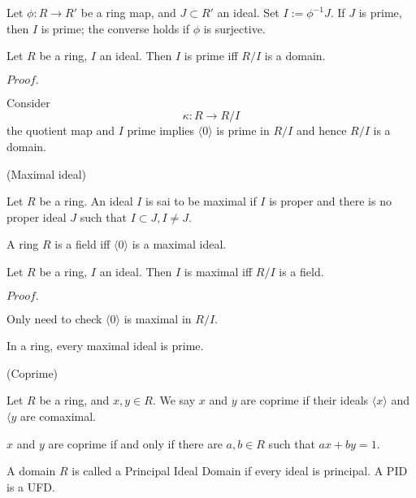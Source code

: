 \documentclass{article}
\newcommand{\Pf}[1]{$Proof.$\par}
\begin{document}
\begin{proposition}
    Let $\phi:R\to R'$ be a ring map, and $J\subset R'$ an ideal. Set $I:=\phi^{-1}J$. If $J$ is prime, then $I$ is prime; the converse holds if $\phi$ is surjective.
\end{proposition}

\begin{corollary}
    Let $R$ be a ring, $I$ an ideal. Then $I$ is prime iff $R/I$ is a domain.
\end{corollary}
\Pf\par
    Consider
    \[
    \kappa:R\to R/I
    \]
    the quotient map and $I$ prime implies $\langle 0 \rangle$ is prime in $R/I$ and hence $R/I$ is a domain.

\begin{definition}
    (Maximal ideal)\par
    Let $R$ be a ring. An ideal $I$ is sai to be maximal if $I$ is proper and there is no proper ideal $J$ such that $I\subset J, I\neq J$.
\end{definition}

\begin{proposition}
    A ring $R$ is a field iff $\langle 0 \rangle$ is a maximal ideal.
\end{proposition}

\begin{corollary}
    Let $R$ be a ring, $I$ an ideal. Then $I$ is maximal iff $R/I$ is a field.
\end{corollary}
\Pf\par
    Only need to check $\langle 0 \rangle $ is maximal in $R/I$.

\begin{corollary}
    In a ring, every maximal ideal is prime.
\end{corollary}

\begin{definition}
    (Coprime)\par
    Let $R$ be a ring, and $x,y\in R$. We say $x$ and $y$ are coprime if their ideals $\langle x\rangle$ and $\langle y$ are comaximal.\par
    $x$ and $y$ are coprime if and only if there are $a,b\in R$ such that $ax+by = 1$.\par
\end{definition}

\begin{definition}
    A domain $R$ is called a Principal Ideal Domain if every ideal is principal. A PID is a UFD.
\end{definition}
\end{document}
